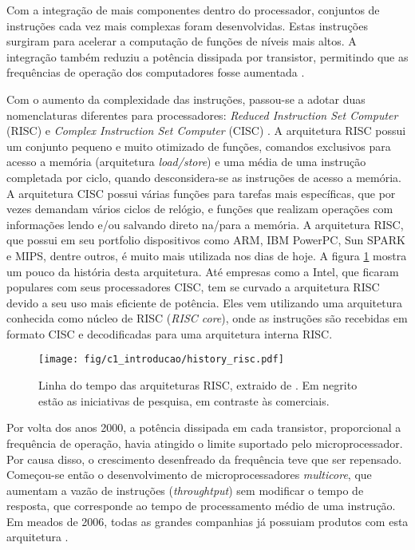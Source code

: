 \documentclass[11pt,a4paper,oneside]{book}
\begin{document}
Com a integra\c{c}\~ao de mais componentes dentro do processador, conjuntos de instru\c{c}\~oes cada vez mais complexas foram desenvolvidas.
Estas instru\c{c}\~oes surgiram para acelerar a computa\c{c}\~ao de fun\c{c}\~oes de n\'iveis mais altos.
A integra\c{c}\~ao tamb\'em reduziu a pot\^encia dissipada por transistor, permitindo que as frequ\^encias de opera\c{c}\~ao dos computadores fosse aumentada \cite{Hennessy2011}.

Com o aumento da complexidade das instruções, passou-se a adotar duas nomenclaturas diferentes para processadores: \textit{Reduced Instruction Set Computer} (RISC) e \textit{Complex Instruction Set Computer} (CISC) \cite{Fedeli2003}.
A arquitetura RISC possui um conjunto pequeno e muito otimizado de funções, comandos exclusivos para acesso a memória (arquitetura \textit{load/store}) e uma média de uma instrução completada por ciclo, quando desconsidera-se as instruções de acesso a memória.
A arquitetura CISC possui várias funções para tarefas mais específicas, que por vezes demandam vários ciclos de relógio, e funções que realizam operações com informações lendo e/ou salvando direto na/para a memória.
A arquitetura RISC, que possui em seu portfolio dispositivos como ARM, IBM PowerPC, Sun SPARK e MIPS, dentre outros, é muito mais utilizada nos dias de hoje.
A figura \ref{fig:history_risc} mostra um pouco da história desta arquitetura.
Até empresas como a Intel, que ficaram populares com seus processadores CISC, tem se curvado a arquitetura RISC devido a seu uso mais eficiente de potência.
Eles vem utilizando uma arquitetura conhecida como núcleo de RISC (\textit{RISC core}), onde as instruções são recebidas em formato CISC e decodificadas para uma arquitetura interna RISC.

\begin{figure}[h]
\centering
\texttt{[image: fig/c1\_introducao/history\_risc.pdf]}
\caption{Linha do tempo das arquiteturas RISC, extraido de \cite{Hennessy2011}. Em negrito estão as iniciativas de pesquisa, em contraste às comerciais.}
\label{fig:history_risc}
\end{figure}

Por volta dos anos 2000, a pot\^encia dissipada em cada transistor, proporcional a frequência de opera\c{c}\~ao, havia atingido o limite suportado pelo microprocessador.
Por causa disso, o crescimento desenfreado da frequ\^encia teve que ser repensado.
Come\c{c}ou-se ent\~ao o desenvolvimento de microprocessadores \textit{multicore}, que aumentam a vaz\~ao de instru\c{c}\~oes (\textit{throughtput}) sem modificar o tempo de resposta, que corresponde ao tempo de processamento médio de uma instrução.
Em meados de 2006, todas as grandes companhias j\'a possuiam produtos com esta arquitetura \cite{Hennessy2011}.
\end{document}
